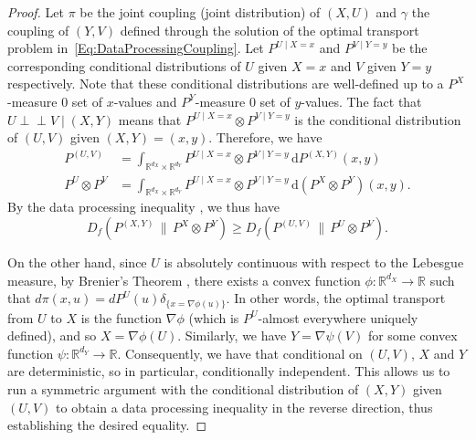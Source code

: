 \documentclass[11pt]{article}
\newcommand{\indep}{\perp\!\!\!\perp}
\begin{document}
\begin{proof}
    Let $\pi$ be the joint coupling (joint distribution) of $(X,U)$ and $\gamma$ the coupling of $(Y,V)$ defined through the solution of the optimal transport problem in~\eqref{Eq:DataProcessingCoupling}. Let $P^{U\mid X=x}$ and $P^{V\mid Y=y}$ be the corresponding conditional distributions
of $U$ given $X=x$ and $V$ given $Y=y$ respectively. Note that these conditional distributions
are well-defined up to a $P^X$-measure 0 set of $x$-values and $P^Y$-measure 0 set of $y$-values. The fact that $U\indep V\mid (X,Y)$ means that $P^{U\mid X=x}\otimes P^{V\mid Y=y}$ is the conditional distribution of $(U,V)$ given $(X,Y)=(x,y)$. Therefore, we have
\begin{align*}
P^{(U,V)} &= \int_{\mathbb{R}^{d_X}\times \mathbb{R}^{d_Y}} P^{U\mid X=x}\otimes P^{V\mid Y=y}\, \mathrm{d}P^{(X,Y)}(x,y)\\
P^U\otimes P^V &= \int_{\mathbb{R}^{d_X}\times \mathbb{R}^{d_Y}} P^{U\mid X=x}\otimes P^{V\mid Y=y}\, \mathrm{d}(P^X\otimes P^Y)(x,y).
\end{align*}
By the data processing inequality \citep[Theorem~7.4]{polyanskiy2024information}, we thus have
\[  
D_f(P^{(X,Y)}\,\|\,P^X\otimes P^Y) \geq D_f(P^{(U,V)}\,\|\,P^U\otimes P^V).
\]

On the other hand, since $U$ is absolutely continuous with respect to the Lebesgue measure, by Brenier's Theorem \citep[see, e.g.][Theorem~2.12]{villani2021topics}, there exists a convex function $\phi: \mathbb{R}^{d_X}\to \mathbb{R}$ such that $d\pi(x,u) = dP^U(u)\delta_{\{x=\nabla \phi(u)\}}$. In other words, the optimal transport from $U$ to $X$ is the function $\nabla \phi$ (which is $P^U$-almost everywhere uniquely defined), and so $X = \nabla\phi(U)$. Similarly, we have $Y=\nabla \psi(V)$ for some
convex function $\psi:\mathbb{R}^{d_Y}\to\mathbb{R}$. Consequently, we have that conditional on $(U,V)$, $X$ and $Y$ are deterministic, so in particular, conditionally independent. This allows us to run a symmetric argument with the conditional distribution of $(X,Y)$ given $(U,V)$ to obtain a data processing inequality in the reverse direction, thus establishing the desired equality.
\end{proof}
\end{document}
